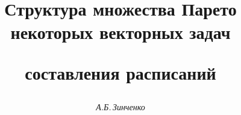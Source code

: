 

 


% 


\newcommand{\tts}[1]{}  


\renewcommand{\baselinestretch}{0.96}


 




\setcounter{page}{81} 












 


\author{\it А.Б.\,Зинченко} 




\title{Структура множества Парето некоторых векторных задач  


составления расписаний} 


 


\date{} 




\pagestyle{plain} %


 




\maketitle 


\label{begin} 


